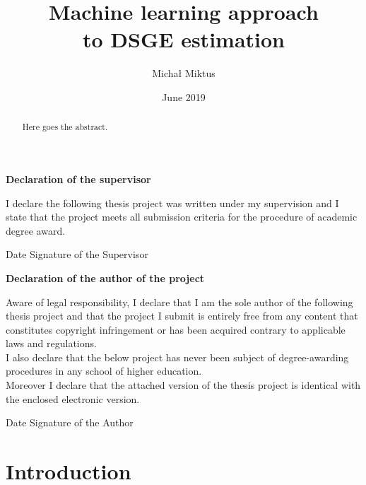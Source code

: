 \documentclass{pracamgr}
\author{Michał Miktus}
\title{Machine learning approach \\
to DSGE estimation}
\date{June 2019}
\numberwithin{equation}{section}
\begin{document}
\maketitle

 \begin{titlepage}
    
    \large
    \null
    \vfill
    
  \textbf{\Large Declaration of the supervisor} 
      \vspace{3mm}
      
   I declare the following thesis project was written under my supervision and I state that the project meets all submission criteria for the procedure of academic degree award.\\
   \vspace{5mm}
   
   Date \hfill Signature of the Supervisor
   
   \vspace{2cm}
   \textbf{\Large Declaration of the author of the project}
    \vspace{3mm}
    
   Aware of legal responsibility, I declare that I am the sole author of the following thesis project and that the project I submit is entirely free from any content that constitutes copyright infringement or has been acquired contrary to applicable laws and regulations.\\
   
   I also declare that the below project has never been subject of degree-awarding procedures in any school of higher education.\\

   Moreover I declare that the attached version of the thesis project is identical with the enclosed electronic version.\\
   \vspace{5mm}
   
   Date  \hfill Signature of the Author 
    \vspace{3cm}
 
\end{titlepage}
    
\begin{abstract}
Here goes the abstract. \\
\end{abstract}

\tableofcontents
\listoffigures
\listoftables
\listofalgorithms


\chapter*{Introduction} \label{Introduction}
\end{document}
